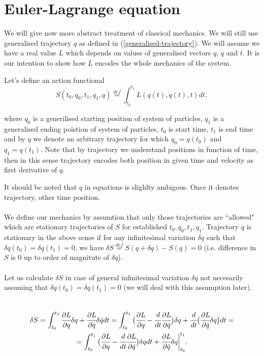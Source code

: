 \documentclass[main.tex]{subfiles}
\begin{document}
\section{Euler-Lagrange equation}

We will give now more abstract treatment of classical mechanics. We will still use generalised trajectory $q$ as defined in (\ref{generalised-trajectory}). 
We will assume we have a real value $L$ which depends on values of generalised vectors $q$, $\dot{q}$ and $t$. It is our intention to show how $L$ encodes the whole mechanics of the system.

Let's define an action functional
\begin{equation}
\label{action-functional-def}
S(t_0, q_0, t_1, q_1, q) \stackrel{def}{=} \int_{t_0}^{t_1} L(q(t), \dot{q}(t), t) dt,
\end{equation}

where $q_0$ is a generilised starting position of system of particles, $q_1$ is a generalised ending poistion of system of particles, $t_0$ is start time, $t_1$ is end time and by $q$ we denote an arbitrary trajectory for which $q_0 = q(t_0)$ and $q_1 = q(t_1)$. Note that by trajectory we understand positions in function of time, then in this sense trajectory encodes both position in given time and velocity as first derivative of $q$.

It should be noted that $q$ in equations is slighlty ambigous. Once it denotes trajectory, other time position.
\\
\\
\indent
We define our mechanics by assumtion that only those trajectories are ``allowed" which are stationary trajectories of $S$ for established $t_0, q_0, t_1, q_1$. Trajectory $q$ is stationary in the above sense if for any infinitesimal variation $\delta q$ such that $\delta q(t_0) = \delta q(t_1) = 0$, we have $\delta S \stackrel{def}{=} S(q + \delta q) - S(q) = 0$ (i.e. difference in $S$ is 0 up to order of magnitute of $\delta q$).
\\
\\
\indent
Let us calculate $\delta S$ in case of general infinitesimal variation $\delta q$ not necesarily assuming that $\delta q(t_0) = \delta q(t_1) = 0$ (we will deal with this assumption later).

\begin{multline}
\\
\delta S =  \int_{t_0}^{t_1} \cfrac{\partial L}{\partial q} \delta q + \cfrac{\partial L}{\partial \dot{q}} \delta \dot{q}dt =  \int_{t_0}^{t_1} \big(\cfrac{\partial L}{\partial q} - \cfrac{d}{dt} \cfrac{\partial L}{\partial \dot{q}}\big)\delta q + \cfrac{d}{dt}\big(\cfrac{\partial L}{\partial \dot{q}} \delta q\big)dt = \\
= \int_{t_0}^{t_1} \big(\cfrac{\partial L}{\partial q} - \cfrac{d}{dt} \cfrac{\partial L}{\partial \dot{q}}\big)\delta qdt + \cfrac{\partial L}{\partial \dot{q}} \delta q \bigg|^{t_1}_{t_0}.
\end{multline}
\end{document}
